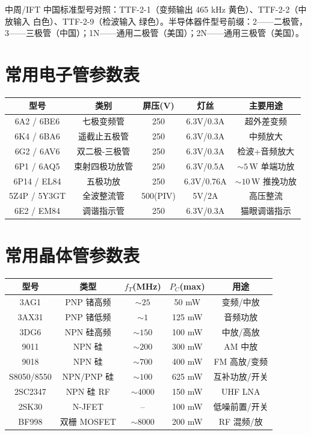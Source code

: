 \documentclass[12pt,UTF8]{ctexbook}
\begin{document}
中周/IFT 中国标准型号对照：TTF-2-1（变频输出 465 kHz 黄色）、TTF-2-2（中放输入 白色）、TTF-2-9（检波输入 绿色）。半导体器件型号前缀：2——二极管，3——三极管（中国）；1N——通用二极管（美国）；2N——通用三极管（美国）。

\chapter{常用电子管参数表}

\begin{center}
\begin{tabular}{c|c|c|c|c}
\hline
\textbf{型号} & \textbf{类别} & \textbf{屏压(V)} & \textbf{灯丝} & \textbf{主要用途} \\
\hline
6A2 / 6BE6 & 七极变频管 & 250 & 6.3V/0.3A & 超外差变频 \\
6K4 / 6BA6 & 遥截止五极管 & 250 & 6.3V/0.3A & 中频放大 \\
6G2 / 6AV6 & 双二极-三极管 & 250 & 6.3V/0.3A & 检波+音频放大 \\
6P1 / 6AQ5 & 束射四极功放管 & 250 & 6.3V/0.5A & $\sim5\,\mathrm{W}$ 单端功放 \\
6P14 / EL84 & 五极功放 & 250 & 6.3V/0.76A & $\sim10\,\mathrm{W}$ 推挽功放 \\
5Z4P / 5Y3GT & 全波整流管 & 500(PIV) & 5V/2A & 高压整流 \\
6E2 / EM84 & 调谐指示管 & 250 & 6.3V/0.3A & 猫眼调谐指示 \\
\hline
\end{tabular}
\end{center}

\chapter{常用晶体管参数表}

\begin{center}
\begin{tabular}{c|c|c|c|c}
\hline
\textbf{型号} & \textbf{类型} & \textbf{$f_T$(MHz)} & \textbf{$P_C$(max)} & \textbf{用途} \\
\hline
3AG1 & PNP 锗高频 & $\sim25$ & 50 mW & 变频/中放 \\
3AX31 & PNP 锗低频 & $\sim1$ & 125 mW & 音频功放 \\
3DG6 & NPN 硅高频 & $\sim150$ & 100 mW & 中放/高放 \\
9011 & NPN 硅 & $\sim200$ & 300 mW & AM 中放 \\
9018 & NPN 硅 & $\sim700$ & 400 mW & FM 高放/变频 \\
S8050/8550 & NPN/PNP 硅 & $\sim100$ & 625 mW & 互补功放/开关 \\
2SC2347 & NPN 硅 RF & $\sim4000$ & 150 mW & UHF LNA \\
2SK30 & N-JFET & -- & 100 mW & 低噪前置/开关 \\
BF998 & 双栅 MOSFET & $\sim8000$ & 200 mW & RF 混频/放 \\
\hline
\end{tabular}
\end{center}
\end{document}
